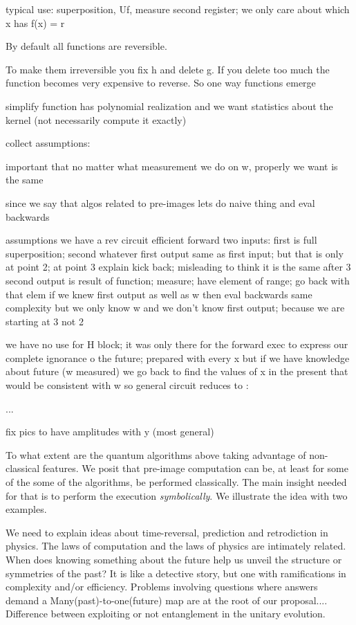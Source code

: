 \documentclass{article}
\begin{document}
\begin{refsection}
typical use: superposition, Uf, measure second register; we only care
about which x has f(x) = r

By default all functions are reversible. 

To make them irreversible you fix h and delete g. If you delete too
much the function becomes very expensive to reverse. So one way
functions emerge


simplify function has polynomial realization and we want
statistics about the kernel (not necessarily compute it exactly)



collect assumptions:


important that no matter what measurement we do on w, properly we want is the same


since we say that algos related to pre-images lets do naive thing and eval backwards

assumptions we have a rev circuit efficient forward
two inputs: first is full superposition; second whatever
first output same as first input; but that is only at point 2; at point 3 explain kick back; misleading to think it is the same after 3
second output is result of function; measure; have element of range; go back with that elem
if we knew first output as well as w then eval backwards same complexity but we only know w and we don't know first output; because we are starting at 3 not 2

we have no use for H block; it was only there for the forward exec to express our complete ignorance o the future; prepared with every x but if we have knowledge about future (w measured) we go back to find the values of x in the present that would be consistent with w so general circuit reduces to :

...

fix pics to have amplitudes with y (most general)

To what extent are the quantum algorithms above taking advantage of
non-classical features. We posit that pre-image computation can be, at
least for some of the some of the algorithms, be performed
classically. The main insight needed for that is to perform the
execution \emph{symbolically}. We illustrate the idea with two
examples.

We need to explain ideas about time-reversal, prediction and retrodiction in 
physics. The laws of computation and the laws of physics are intimately related. 
When does knowing something about the future help us unveil the structure or 
symmetries of the past? It is like a detective story, but one with 
ramifications in complexity and/or efficiency. Problems involving questions 
where answers demand a Many(past)-to-one(future) map are at the root of 
our proposal.... {\color{red} Difference between exploiting or not entanglement
in the unitary evolution.}


\end{refsection}
\end{document}
